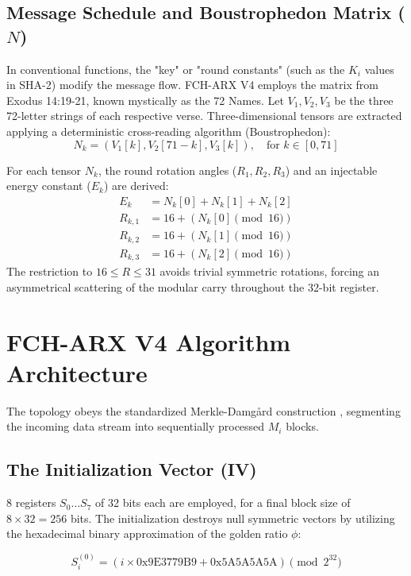 \documentclass[10pt,journal,compsoc]{IEEEtran}
\begin{document}
\subsection{Message Schedule and Boustrophedon Matrix ($N$)}
In conventional functions, the "key" or "round constants" (such as the $K_i$ values in SHA-2) modify the message flow. FCH-ARX V4 employs the matrix from Exodus 14:19-21, known mystically as the 72 Names.
Let $V_1, V_2, V_3$ be the three 72-letter strings of each respective verse. Three-dimensional tensors are extracted applying a deterministic cross-reading algorithm (Boustrophedon):
\begin{equation}
N_k = \left( V_1[k], V_2[71 - k], V_3[k] \right), \quad \text{for } k \in [0, 71]
\end{equation}

For each tensor $N_k$, the round rotation angles ($R_1, R_2, R_3$) and an injectable energy constant ($E_k$) are derived:
\begin{align}
E_k &= N_k[0] + N_k[1] + N_k[2] \\
R_{k,1} &= 16 + (N_k[0] \pmod{16}) \\
R_{k,2} &= 16 + (N_k[1] \pmod{16}) \\
R_{k,3} &= 16 + (N_k[2] \pmod{16})
\end{align}
The restriction to $16 \leq R \leq 31$ avoids trivial symmetric rotations, forcing an asymmetrical scattering of the modular carry throughout the 32-bit register.

\section{FCH-ARX V4 Algorithm Architecture}

The topology obeys the standardized Merkle-Damgård construction \cite{damgard1989design}, segmenting the incoming data stream into sequentially processed $M_i$ blocks.

\subsection{The Initialization Vector (IV)}
8 registers $S_0 \dots S_7$ of 32 bits each are employed, for a final block size of $8 \times 32 = 256$ bits. The initialization destroys null symmetric vectors by utilizing the hexadecimal binary approximation of the golden ratio $\phi$:

\begin{equation}
S_i^{(0)} = \left(i \times \text{0x9E3779B9} + \text{0x5A5A5A5A}\right) \pmod{2^{32}}
\end{equation}
\end{document}
